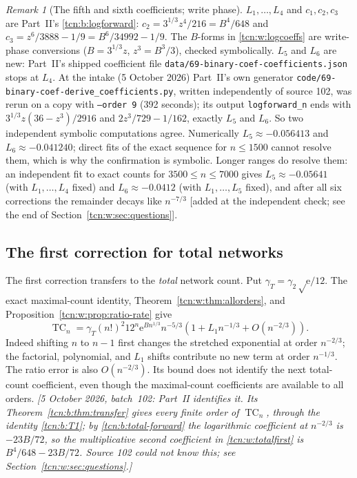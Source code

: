 \documentclass[11pt,letterpaper]{article}
\newcommand{\ee}{\mathrm e}
\newcommand{\TC}{\operatorname{TC}}
\theoremstyle{remark}
\newtheorem{remark}[theorem]{Remark}
\begin{document}
\begin{remark}[The fifth and sixth coefficients; write phase]\label{tcn:w:rem:L56}
$L_1,\ldots,L_4$ and $c_1,c_2,c_3$ are Part~II's \eqref{tcn:b:logforward}: $c_2=3^{1/3}z^4/216=B^4/648$ and $c_3=z^6/3888-1/9=B^6/34992-1/9$. The $B$-forms in \eqref{tcn:w:logcoeffs} are write-phase conversions ($B=3^{1/3}z$, $z^3=B^3/3$), checked symbolically. $L_5$ and $L_6$ are new: Part~II's shipped coefficient file \textup{\nolinkurl{data/69-binary-coef-coefficients.json}} stops at $L_4$. At the intake (5 October 2026) Part~II's own generator \textup{\nolinkurl{code/69-binary-coef-derive_coefficients.py}}, written independently of source 102, was rerun on a copy with \texttt{--order 9} (392 seconds); its output \texttt{logforward\_n} ends with $3^{1/3}z(36-z^3)/2916$ and $2z^3/729-1/162$, exactly $L_5$ and $L_6$. So two independent symbolic computations agree. Numerically $L_5\approx-0.056413$ and $L_6\approx-0.041240$; direct fits of the exact sequence for $n\le1500$ cannot resolve them, which is why the confirmation is symbolic. Longer ranges do resolve them: an independent fit to exact counts for $3500\le n\le7000$ gives $L_5\approx-0.05641$ (with $L_1,\ldots,L_4$ fixed) and $L_6\approx-0.0412$ (with $L_1,\ldots,L_5$ fixed), and after all six corrections the remainder decays like $n^{-7/3}$ \textup{[}added at the independent check; see the end of Section~\ref{tcn:w:sec:questions}\textup{]}.
\end{remark}

\subsection{The first correction for total networks}
The first correction transfers to the \emph{total} network count. Put $\gamma_T=\gamma_2\sqrt\ee/12$. The exact maximal-count identity, Theorem~\ref{tcn:w:thm:allorders}, and Proposition~\ref{tcn:w:prop:ratio-rate} give
\begin{equation}\label{tcn:w:totalfirst}
 \TC_n=\gamma_T(n!)^2 12^n\ee^{Bn^{1/3}}n^{-5/3}
       \left(1+L_1n^{-1/3}+O(n^{-2/3})\right).
\end{equation}
Indeed shifting $n$ to $n-1$ first changes the stretched exponential at order $n^{-2/3}$; the factorial, polynomial, and $L_1$ shifts contribute no new term at order $n^{-1/3}$. The ratio error is also $O(n^{-2/3})$. Its bound does not identify the next total-count coefficient, even though the maximal-count coefficients are available to all orders. \emph{[5 October 2026, batch~102: Part~II identifies it. Its Theorem~\ref{tcn:b:thm:transfer} gives every finite order of $\TC_n$, through the identity \eqref{tcn:b:T1}; by \eqref{tcn:b:total-forward} the logarithmic coefficient at $n^{-2/3}$ is $-23B/72$, so the multiplicative second coefficient in \eqref{tcn:w:totalfirst} is $B^4/648-23B/72$. Source 102 could not know this; see Section~\ref{tcn:w:sec:questions}.]}
\end{document}
